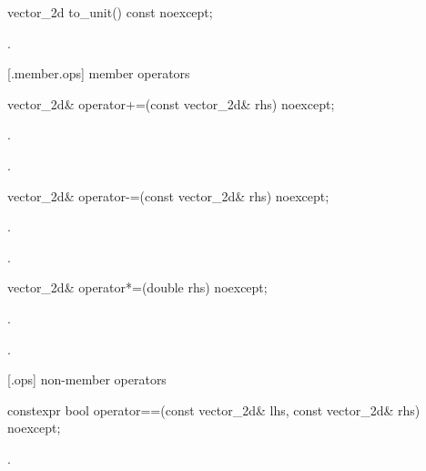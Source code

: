 \begin{itemdecl}
vector_2d to_unit() const noexcept;
\end{itemdecl}
\begin{itemdescr}
\pnum
\returns
{}.
\end{itemdescr}

 [\vectortwod.member.ops] { member operators}

\begin{itemdecl}
vector_2d& operator+=(const vector_2d& rhs) noexcept;
\end{itemdecl}
\begin{itemdescr}
\pnum
\effects
{}.
	
\pnum
\returns
{}.
\end{itemdescr}

\begin{itemdecl}
vector_2d& operator-=(const vector_2d& rhs) noexcept;
\end{itemdecl}
\begin{itemdescr}
\pnum
\effects
{}.
	
\pnum
\returns
{}.
\end{itemdescr}

\begin{itemdecl}
vector_2d& operator*=(double rhs) noexcept;
\end{itemdecl}
\begin{itemdescr}
\pnum
\effects
{}.
	
\pnum
\returns
{}.
\end{itemdescr}

 [\vectortwod.ops] { non-member operators}

\begin{itemdecl}
constexpr bool operator==(const vector_2d& lhs, const vector_2d& rhs) noexcept;
\end{itemdecl}
\begin{itemdescr}
\pnum
\returns
{}.
\end{itemdescr}

